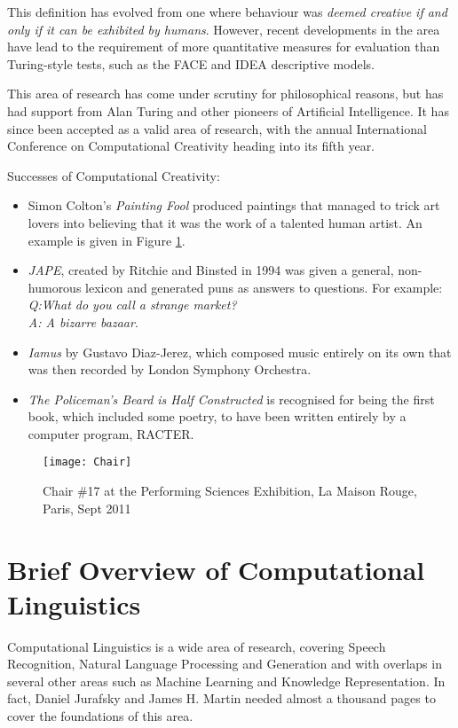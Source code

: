 This definition has evolved from one where behaviour was \textit{deemed creative if and only if it can be exhibited by humans}\cite{wiggins2006searching}. However, recent developments in the area have lead to the requirement of more quantitative measures for evaluation than Turing-style tests, such as the FACE and IDEA descriptive models\cite{colton2011computational}.

This area of research has come under scrutiny for philosophical reasons, but has had support from Alan Turing and other pioneers of Artificial Intelligence. It has since been accepted as a valid area of research, with the annual International Conference on Computational Creativity heading into its fifth year.

Successes of Computational Creativity:
\begin{itemize}
\item{Simon Colton's \textit{Painting Fool}\cite{colton2012painting} produced paintings that managed to trick art lovers into believing that it was the work of a talented human artist. An example is given in Figure \ref{fig:chair}.}
\item{\textit{JAPE}\cite{binsted1997computational}, created by Ritchie and Binsted in 1994 was given a general, non-humorous lexicon and generated puns as answers to questions. For example:\\\textit{Q:What do you call a strange market?\\ A: A bizarre bazaar}.}
\item{\textit{Iamus} by Gustavo Diaz-Jerez\cite{diaz2011composing}, which composed music entirely on its own that was then recorded by London Symphony Orchestra.}
\item{\textit{The Policeman's Beard is Half Constructed}\cite{chamberlain1984policeman} is recognised for being the first book, which included some poetry, to have been written entirely by a computer program, RACTER.}
\end{itemize} 

\begin{figure}[h!]
\centering
\texttt{[image: Chair]}
\caption{Chair \#17 at the Performing Sciences Exhibition, La Maison Rouge, Paris, Sept 2011}
\label{fig:chair}
\end{figure}

\section{Brief Overview of Computational Linguistics}
Computational Linguistics is a wide area of research, covering Speech Recognition, Natural Language Processing and Generation and with overlaps in several other areas such as Machine Learning and Knowledge Representation. In fact, Daniel Jurafsky and James H. Martin needed almost a thousand pages to cover the foundations of this area\cite{jurafsky2000speech}.

